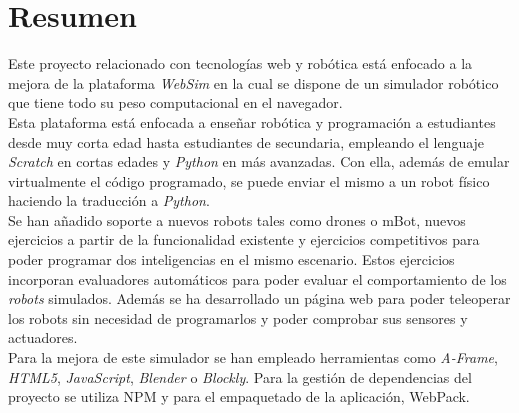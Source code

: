 \chapter*{Resumen}

     Este proyecto relacionado con tecnologías web y robótica está enfocado a la mejora de la plataforma \emph{WebSim} en la cual se dispone de un simulador robótico que tiene todo su peso computacional en el navegador. \\
       
    Esta plataforma está enfocada a enseñar robótica y programación a estudiantes desde muy corta edad hasta estudiantes de secundaria, empleando el lenguaje \emph{Scratch} en cortas edades y \emph{Python} en más avanzadas. Con ella, además de emular virtualmente el código programado, se puede enviar el mismo a un robot físico haciendo la traducción a \emph{Python}. \\
    
    
    Se han añadido soporte a nuevos robots tales como drones o mBot, nuevos ejercicios a partir de la funcionalidad existente y ejercicios competitivos para poder programar dos inteligencias en el mismo escenario. Estos ejercicios incorporan evaluadores automáticos para poder evaluar el comportamiento de los \textit{robots} simulados. Además se ha desarrollado un página web para poder teleoperar los robots sin necesidad de programarlos y poder comprobar sus sensores y actuadores. \\
    
    
    Para la mejora de este simulador se han empleado herramientas como \textit{A-Frame}, \textit{HTML5}, \textit{JavaScript}, \textit{Blender} o \textit{Blockly}. Para la gestión de dependencias del proyecto se utiliza NPM y para el empaquetado de la aplicación, WebPack.